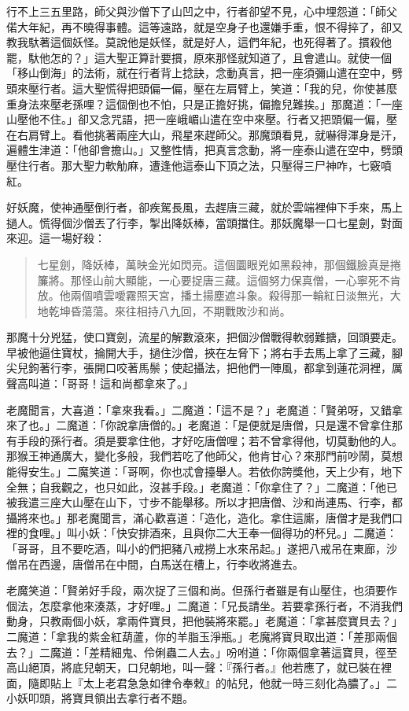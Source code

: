 行不上三五里路，師父與沙僧下了山凹之中，行者卻望不見，心中埋怨道：「師父偌大年紀，再不曉得事體。這等遠路，就是空身子也還嫌手重，恨不得捽了，卻又教我馱著這個妖怪。莫說他是妖怪，就是好人，這們年紀，也死得著了。摜殺他罷，馱他怎的？」這大聖正算計要摜，原來那怪就知道了，且會遣山。就使一個「移山倒海」的法術，就在行者背上捻訣，念動真言，把一座須彌山遣在空中，劈頭來壓行者。這大聖慌得把頭偏一偏，壓在左肩臂上，笑道：「我的兒，你使甚麼重身法來壓老孫哩？這個倒也不怕，只是正擔好挑，偏擔兒難挨。」那魔道：「一座山壓他不住。」卻又念咒語，把一座峨嵋山遣在空中來壓。行者又把頭偏一偏，壓在右肩臂上。看他挑著兩座大山，飛星來趕師父。那魔頭看見，就嚇得渾身是汗，遍體生津道：「他卻會擔山。」又整性情，把真言念動，將一座泰山遣在空中，劈頭壓住行者。那大聖力軟觔麻，遭逢他這泰山下頂之法，只壓得三尸神咋，七竅噴紅。

好妖魔，使神通壓倒行者，卻疾駕長風，去趕唐三藏，就於雲端裡伸下手來，馬上撾人。慌得個沙僧丟了行李，掣出降妖棒，當頭擋住。那妖魔舉一口七星劍，對面來迎。這一場好殺：
\begin{quote}
七星劍，降妖棒，萬映金光如閃亮。這個圜眼兇如黑殺神，那個鐵臉真是捲簾將。那怪山前大顯能，一心要捉唐三藏。這個努力保真僧，一心寧死不肯放。他兩個噴雲噯霧照天宮，播土揚塵遮斗象。殺得那一輪紅日淡無光，大地乾坤昏蕩蕩。來往相持八九回，不期戰敗沙和尚。
\end{quote}

那魔十分兇猛，使口寶劍，流星的解數滾來，把個沙僧戰得軟弱難搪，回頭要走。早被他逼住寶杖，掄開大手，撾住沙僧，挾在左脅下；將右手去馬上拿了三藏，腳尖兒鉤著行李，張開口咬著馬鬃；使起攝法，把他們一陣風，都拿到蓮花洞裡，厲聲高叫道：「哥哥！這和尚都拿來了。」

老魔聞言，大喜道：「拿來我看。」二魔道：「這不是？」老魔道：「賢弟呀，又錯拿來了也。」二魔道：「你說拿唐僧的。」老魔道：「是便就是唐僧，只是還不曾拿住那有手段的孫行者。須是要拿住他，才好吃唐僧哩；若不曾拿得他，切莫動他的人。那猴王神通廣大，變化多般，我們若吃了他師父，他肯甘心？來那門前吵鬧，莫想能得安生。」二魔笑道：「哥啊，你也忒會擡舉人。若依你誇獎他，天上少有，地下全無；自我觀之，也只如此，沒甚手段。」老魔道：「你拿住了？」二魔道：「他已被我遣三座大山壓在山下，寸步不能舉移。所以才把唐僧、沙和尚連馬、行李，都攝將來也。」那老魔聞言，滿心歡喜道：「造化，造化。拿住這廝，唐僧才是我們口裡的食哩。」叫小妖：「快安排酒來，且與你二大王奉一個得功的杯兒。」二魔道：「哥哥，且不要吃酒，叫小的們把豬八戒撈上水來吊起。」遂把八戒吊在東廊，沙僧吊在西邊，唐僧吊在中間，白馬送在槽上，行李收將進去。

老魔笑道：「賢弟好手段，兩次捉了三個和尚。但孫行者雖是有山壓住，也須要作個法，怎麼拿他來湊蒸，才好哩。」二魔道：「兄長請坐。若要拿孫行者，不消我們動身，只教兩個小妖，拿兩件寶貝，把他裝將來罷。」老魔道：「拿甚麼寶貝去？」二魔道：「拿我的紫金紅葫蘆，你的羊脂玉淨瓶。」老魔將寶貝取出道：「差那兩個去？」二魔道：「差精細鬼、伶俐蟲二人去。」吩咐道：「你兩個拿著這寶貝，徑至高山絕頂，將底兒朝天，口兒朝地，叫一聲：『孫行者。』他若應了，就已裝在裡面，隨即貼上『太上老君急急如律令奉敕』的帖兒，他就一時三刻化為膿了。」二小妖叩頭，將寶貝領出去拿行者不題。

